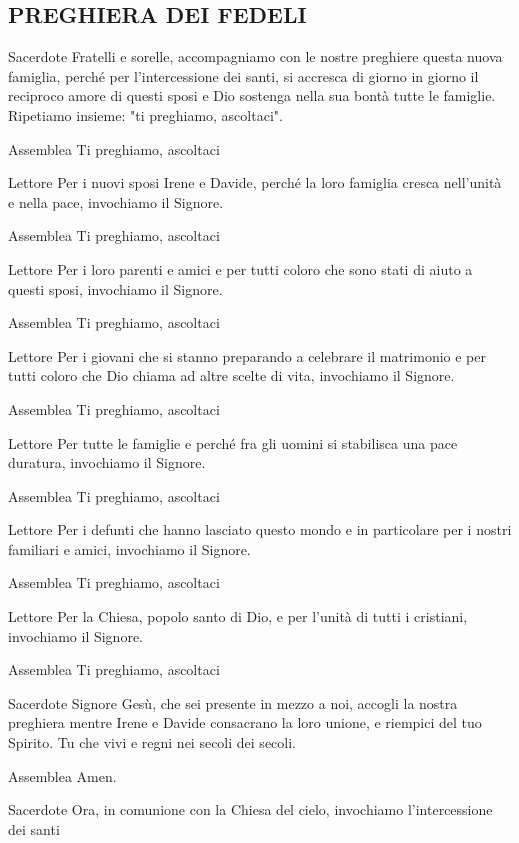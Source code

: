 
\subsection*{PREGHIERA DEI FEDELI}

\begin{dialoghi}
\item[Sacerdote] Fratelli e sorelle, accompagniamo con le nostre preghiere questa nuova famiglia, perché per l'intercessione dei santi, si accresca di giorno in giorno il reciproco amore di questi sposi e Dio sostenga nella sua bontà tutte le famiglie. Ripetiamo insieme: "ti preghiamo, ascoltaci".
\item[Assemblea] Ti preghiamo, ascoltaci
\item[Lettore] Per i nuovi sposi Irene e Davide, perché la loro famiglia cresca nell'unità e nella pace, invochiamo il Signore.
\item[Assemblea] Ti preghiamo, ascoltaci
\item[Lettore] Per i loro parenti e amici e per tutti coloro che sono stati di aiuto a questi sposi, invochiamo il Signore.
\item[Assemblea] Ti preghiamo, ascoltaci
\item[Lettore] Per i giovani che si stanno preparando a celebrare il matrimonio e per tutti coloro che Dio chiama ad altre scelte di vita, invochiamo il Signore.
\item[Assemblea] Ti preghiamo, ascoltaci
\item[Lettore] Per tutte le famiglie e perché fra gli uomini si stabilisca una pace duratura, invochiamo il Signore.
\item[Assemblea] Ti preghiamo, ascoltaci
\item[Lettore] Per i defunti che hanno lasciato questo mondo e in particolare per i nostri familiari e amici, invochiamo il Signore.
\item[Assemblea] Ti preghiamo, ascoltaci
\item[Lettore] Per la Chiesa, popolo santo di Dio, e per l'unità di tutti i cristiani, invochiamo il Signore.
\item[Assemblea] Ti preghiamo, ascoltaci
\item[Sacerdote] Signore Gesù, che sei presente in mezzo a noi, accogli la nostra preghiera mentre Irene e Davide consacrano la loro unione, e riempici del tuo Spirito. Tu che vivi e regni nei secoli dei secoli.
\item[Assemblea] Amen.
\item[Sacerdote] Ora, in comunione con la Chiesa del cielo, invochiamo l'intercessione dei santi


\end{dialoghi}

